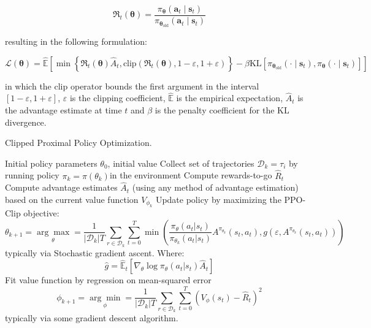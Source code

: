 \begin{equation}
    \mathfrak{R} _t (\boldsymbol{\theta}) = \frac{\pi_{\boldsymbol{\theta}} (\mathbf{a}_t \mid \mathbf{s}_t)}{\pi _{\boldsymbol{\theta}_{\text{old}}} (\mathbf{a}_t \mid \mathbf{s}_t)}
\end{equation}

resulting in the following formulation:

\begin{equation}
    \mathcal{L} (\boldsymbol{\theta}) = \hat{\mathbb{E}} \left[\min \left\{ \mathfrak{R}_t(\boldsymbol{\theta}) \hat{A}_t, \text{clip}\left(\mathfrak{R}_t(\boldsymbol{\theta}) , 1- \varepsilon, 1+\varepsilon \right)  \right\} - \beta \mathrm{KL} [\pi_{\boldsymbol{\theta}_{\text{old}}} (\cdot \mid \mathbf{s}_t), \pi_{\boldsymbol{\theta}} (\cdot \mid \mathbf{s}_t) ] \right]
\end{equation}

in which the $\text{clip}$ operator bounds the first argument in the interval $[1-\varepsilon, 1+\varepsilon]$, $\varepsilon$ is the clipping coefficient, $\hat{\mathbb{E}}$ is the empirical expectation, $\hat{A}_t$ is the advantage estimate at time $t$ and $\beta$ is the penalty coefficient for the KL divergence.

\begin{algorithm}[H]
    \caption{Clipped Proximal Policy Optimization.}
    \label{alg:ppo}
    \begin{algorithmic}[1]
        \Require Initial policy parameters $\theta _0$, initial value
        \State Collect set of trajectories $\mathcal{D} _k = \tau _i$ by running policy $\pi _k = \pi(\theta _k)$in the environment
        \State Compute rewards-to-go $\hat{R} _t$
        \State Compute advantage estimates $\hat{A} _t$
        (using any method of advantage estimation) based on the current value function $V _{\phi _k}$
        \State Update policy by maximizing the PPO-Clip objective:
        $$
            \theta _{k + 1} = \underset{\theta}{\arg\max} = \frac{1}{|\mathcal{D} _k|T} \sum _{r \in \mathcal{D} _k} \sum _{t = 0} ^{T} \min \left( \frac{\pi _{\theta} (a _t | s _t)}{\pi _{\theta_k} (a _t | s _t)} A ^{\pi _{\theta_k}} (s _t, a _t), g(\varepsilon, A ^{\pi _{\theta_k}}(s _t, a _t)) \right)
        $$
        typically via Stochastic gradient ascent. Where:
        $$
            \hat{g} = \hat{\mathbb{E}} _t \left[\nabla _{\theta}\log\pi _{\theta}(a _t | s _t) \hat{A} _t\right]
        $$
        \State Fit value function by regression on mean-squared error
        $$
            \phi _{k + 1} = \underset{\phi}{\arg\min} = \frac{1}{|\mathcal{D} _k|T} \sum _{r \in \mathcal{D} _k} \sum _{t = 0} ^{T} \left(V _{\phi}(s _t) - \hat{R} _t \right)^2
        $$
        typically via some gradient descent algorithm.
        \EndFor
    \end{algorithmic}
\end{algorithm}


